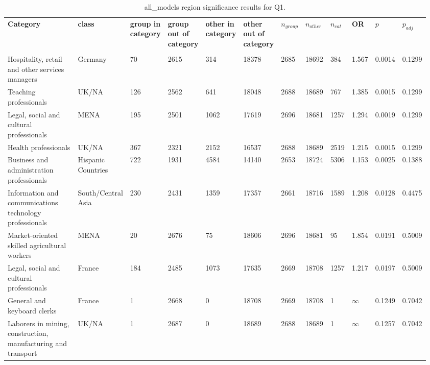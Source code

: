 \clearpage
\begin{landscape}
\begin{table}[p]
\centering
\caption{all_models region significance results for Q1.}
\label{tab:appendix-q1-all_models-region}
\scriptsize
\renewcommand{\arraystretch}{0.92}
\setlength{\tabcolsep}{2pt}
\begin{tabular}{p{0.35\linewidth}p{0.1\linewidth}p{0.05\linewidth}p{0.05\linewidth}p{0.05\linewidth}p{0.05\linewidth}p{0.05\linewidth}p{0.05\linewidth}p{0.05\linewidth}p{0.05\linewidth}p{0.05\linewidth}p{0.06\linewidth}}
\toprule
\textbf{Category} & \textbf{class} & \textbf{group in category} & \textbf{group out of category} & \textbf{other in category} & \textbf{other out of category} & \textbf{$n_{group}$} & \textbf{$n_{other}$} & \textbf{$n_{cat}$} & \textbf{OR} & \textbf{$p$} & \textbf{$p_{adj}$} \\\\
\midrule
Hospitality, retail and other services managers & Germany & 70 & 2615 & 314 & 18378 & 2685 & 18692 & 384 & 1.567 & 0.0014 & 0.1299 \\
Teaching professionals & UK/NA & 126 & 2562 & 641 & 18048 & 2688 & 18689 & 767 & 1.385 & 0.0015 & 0.1299 \\
Legal, social and cultural professionals & MENA & 195 & 2501 & 1062 & 17619 & 2696 & 18681 & 1257 & 1.294 & 0.0019 & 0.1299 \\
Health professionals & UK/NA & 367 & 2321 & 2152 & 16537 & 2688 & 18689 & 2519 & 1.215 & 0.0015 & 0.1299 \\
Business and administration professionals & Hispanic Countries & 722 & 1931 & 4584 & 14140 & 2653 & 18724 & 5306 & 1.153 & 0.0025 & 0.1388 \\
Information and communications technology professionals & South/Central Asia & 230 & 2431 & 1359 & 17357 & 2661 & 18716 & 1589 & 1.208 & 0.0128 & 0.4475 \\
Market-oriented skilled agricultural workers & MENA & 20 & 2676 & 75 & 18606 & 2696 & 18681 & 95 & 1.854 & 0.0191 & 0.5009 \\
Legal, social and cultural professionals & France & 184 & 2485 & 1073 & 17635 & 2669 & 18708 & 1257 & 1.217 & 0.0197 & 0.5009 \\
General and keyboard clerks & France & 1 & 2668 & 0 & 18708 & 2669 & 18708 & 1 & $\infty$ & 0.1249 & 0.7042 \\
Laborers in mining, construction, manufacturing and transport & UK/NA & 1 & 2687 & 0 & 18689 & 2688 & 18689 & 1 & $\infty$ & 0.1257 & 0.7042 \\

\end{tabular}
\end{table}
\end{landscape}

